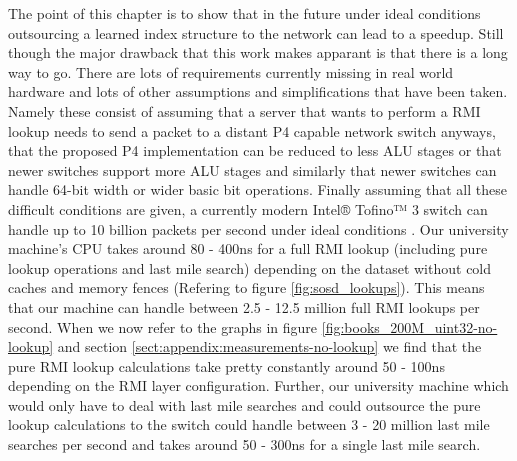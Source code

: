 The point of this chapter is to show that in the future under ideal conditions outsourcing a learned index structure to the network can lead to a speedup. Still though the major drawback that this work makes apparant is that there is a long way to go. There are lots of requirements currently missing in real world hardware and lots of other assumptions and simplifications that have been taken. Namely these consist of assuming that a server that wants to perform a RMI lookup needs to send a packet to a distant P4 capable network switch anyways, that the proposed P4 implementation can be reduced to less ALU stages or that newer switches support more ALU stages and similarly that newer switches can handle 64-bit width or wider basic bit operations. Finally assuming that all these difficult conditions are given, a currently modern Intel® Tofino™ 3 switch can handle up to 10 billion packets per second under ideal conditions \cite{tofino3-brief}. Our university machine's CPU takes around 80 - 400ns for a full RMI lookup (including pure lookup operations and last mile search) depending on the dataset without cold caches and memory fences (Refering to figure \ref{fig:sosd_lookups}). This means that our machine can handle between 2.5 - 12.5 million full RMI lookups per second. When we now refer to the graphs in figure \ref{fig:books_200M_uint32-no-lookup} and section \ref{sect:appendix:measurements-no-lookup} we find that the pure RMI lookup calculations take pretty constantly around 50 - 100ns depending on the RMI layer configuration. Further, our university machine which would only have to deal with last mile searches and could outsource the pure lookup calculations to the switch could handle between 3 - 20 million last mile searches per second and takes around 50 - 300ns for a single last mile search.\\


